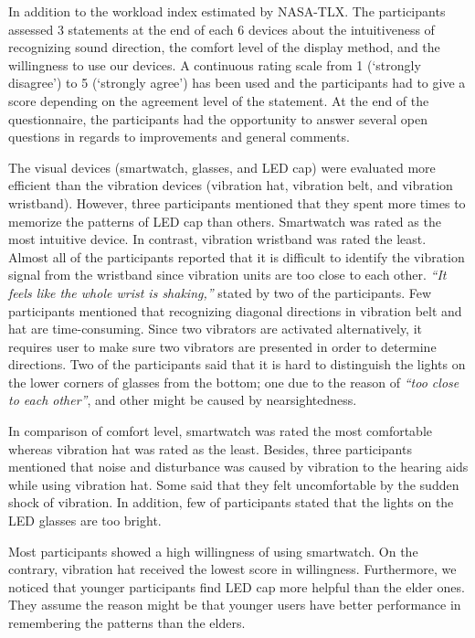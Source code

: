 \documentclass{sigchi}
\begin{document}
In addition to the workload index estimated by NASA-TLX. The participants assessed 3 statements at the end of each 6 devices about the intuitiveness of recognizing sound direction, the comfort level of the display method, and the willingness to use our devices. %
A continuous rating scale from 1 (\textquoteleft strongly disagree\textquoteright) to 5 (\textquoteleft strongly agree\textquoteright) has been used and the participants had to give a score depending on the agreement level of the statement. At the end of the questionnaire, the participants had the opportunity to answer several open questions in regards to improvements and general comments.

The visual devices (smartwatch, glasses, and LED cap) were evaluated more efficient than the vibration devices (vibration hat, vibration belt, and vibration wristband). However, three participants mentioned that they spent more times to memorize the patterns of LED cap than others. Smartwatch was rated as the most intuitive device. In contrast, vibration wristband was rated the least. Almost all of the participants reported that it is difficult to identify the vibration signal from the wristband since vibration units are too close to each other. \textit{\textquotedblleft It feels like the whole wrist is shaking,\textquotedblright} stated by two of the participants. Few participants mentioned that recognizing diagonal directions in vibration belt and hat are time-consuming. Since two vibrators are activated alternatively, it requires user to make sure two vibrators are presented in order to determine directions. Two of the participants said that it is hard to distinguish the lights on the lower corners of glasses from the bottom; one due to the reason of \textit{\textquotedblleft too close to each other\textquotedblright}, and other might be caused by nearsightedness.

In comparison of comfort level, smartwatch was rated the most comfortable whereas vibration hat was rated as the least. Besides, three participants mentioned that noise and disturbance was caused by vibration to the hearing aids while using vibration hat. Some said that they felt uncomfortable by the sudden shock of vibration. In addition, few of participants stated that the lights on the LED glasses are too bright.

Most participants showed a high willingness of using smartwatch. On the contrary, vibration hat received the lowest score in willingness. Furthermore, we noticed that younger participants find LED cap more helpful than the elder ones. They assume the reason might be that younger users have better performance in remembering the patterns than the elders.
\end{document}
